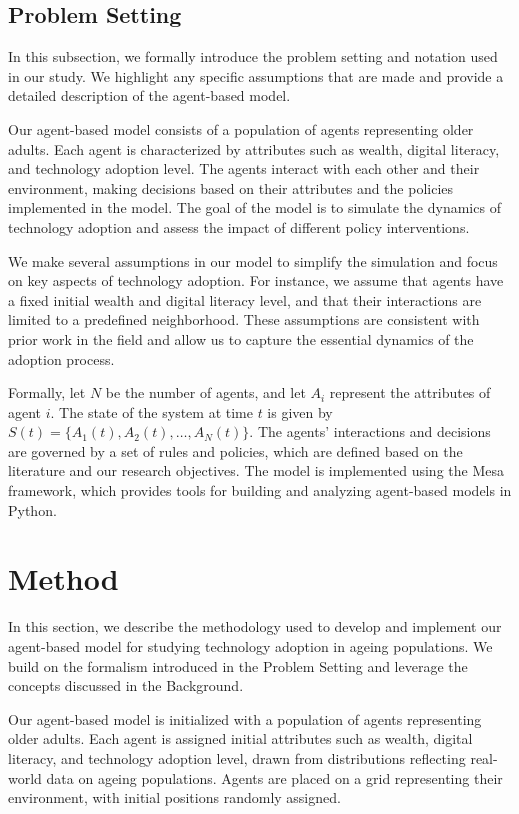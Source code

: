 \documentclass{article} %
\begin{document}
\subsection{Problem Setting}
\label{sec:problem_setting}

In this subsection, we formally introduce the problem setting and notation used in our study. We highlight any specific assumptions that are made and provide a detailed description of the agent-based model.

Our agent-based model consists of a population of agents representing older adults. Each agent is characterized by attributes such as wealth, digital literacy, and technology adoption level. The agents interact with each other and their environment, making decisions based on their attributes and the policies implemented in the model. The goal of the model is to simulate the dynamics of technology adoption and assess the impact of different policy interventions.

We make several assumptions in our model to simplify the simulation and focus on key aspects of technology adoption. For instance, we assume that agents have a fixed initial wealth and digital literacy level, and that their interactions are limited to a predefined neighborhood. These assumptions are consistent with prior work in the field and allow us to capture the essential dynamics of the adoption process.

Formally, let \( N \) be the number of agents, and let \( A_i \) represent the attributes of agent \( i \). The state of the system at time \( t \) is given by \( S(t) = \{A_1(t), A_2(t), \ldots, A_N(t)\} \). The agents' interactions and decisions are governed by a set of rules and policies, which are defined based on the literature and our research objectives. The model is implemented using the Mesa framework, which provides tools for building and analyzing agent-based models in Python.

\section{Method}
\label{sec:method}

In this section, we describe the methodology used to develop and implement our agent-based model for studying technology adoption in ageing populations. We build on the formalism introduced in the Problem Setting and leverage the concepts discussed in the Background.

Our agent-based model is initialized with a population of agents representing older adults. Each agent is assigned initial attributes such as wealth, digital literacy, and technology adoption level, drawn from distributions reflecting real-world data on ageing populations. Agents are placed on a grid representing their environment, with initial positions randomly assigned.
\end{document}
